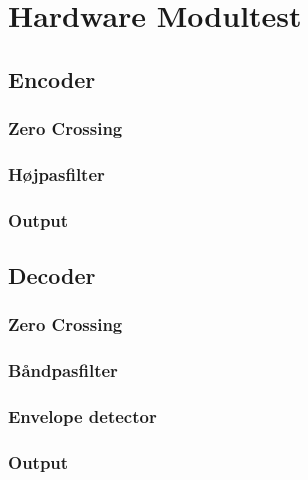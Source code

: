 \chapter{Hardware Modultest}

\section{Encoder}



\subsection{Zero Crossing}

\subsection{Højpasfilter}

\subsection{Output}

\section{Decoder}

\subsection{Zero Crossing}

\subsection{Båndpasfilter}

\subsection{Envelope detector}

\subsection{Output}


\clearpage